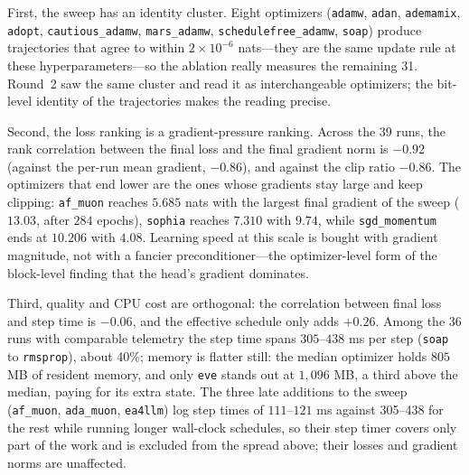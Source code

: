 First, the sweep has an identity cluster. Eight optimizers (\texttt{adamw}, \texttt{adan}, \texttt{ademamix}, \texttt{adopt}, \texttt{cautious\_adamw}, \texttt{mars\_adamw}, \texttt{schedulefree\_adamw}, \texttt{soap}) produce trajectories that agree to within $2\times10^{-6}$ nats---they are the same update rule at these hyperparameters---so the ablation really measures the remaining 31. Round~2 saw the same cluster and read it as interchangeable optimizers; the bit-level identity of the trajectories makes the reading precise.

Second, the loss ranking is a gradient-pressure ranking. Across the $39$ runs, the rank correlation between the final loss and the final gradient norm is $-0.92$ (against the per-run mean gradient, $-0.86$), and against the clip ratio $-0.86$. The optimizers that end lower are the ones whose gradients stay large and keep clipping: \texttt{af\_muon} reaches $5.685$ nats with the largest final gradient of the sweep ($13.03$, after $284$ epochs), \texttt{sophia} reaches $7.310$ with $9.74$, while \texttt{sgd\_momentum} ends at $10.206$ with $4.08$. Learning speed at this scale is bought with gradient magnitude, not with a fancier preconditioner---the optimizer-level form of the block-level finding that the head's gradient dominates.

Third, quality and CPU cost are orthogonal: the correlation between final loss and step time is $-0.06$, and the effective schedule only adds $+0.26$. Among the 36 runs with comparable telemetry the step time spans $305$--$438$ ms per step (\texttt{soap} to \texttt{rmsprop}), about 40\%; memory is flatter still: the median optimizer holds $805$ MB of resident memory, and only \texttt{eve} stands out at $1{,}096$ MB, a third above the median, paying for its extra state. The three late additions to the sweep (\texttt{af\_muon}, \texttt{ada\_muon}, \texttt{ea4llm}) log step times of $111$--$121$ ms against 305--438 for the rest while running longer wall-clock schedules, so their step timer covers only part of the work and is excluded from the spread above; their losses and gradient norms are unaffected.

